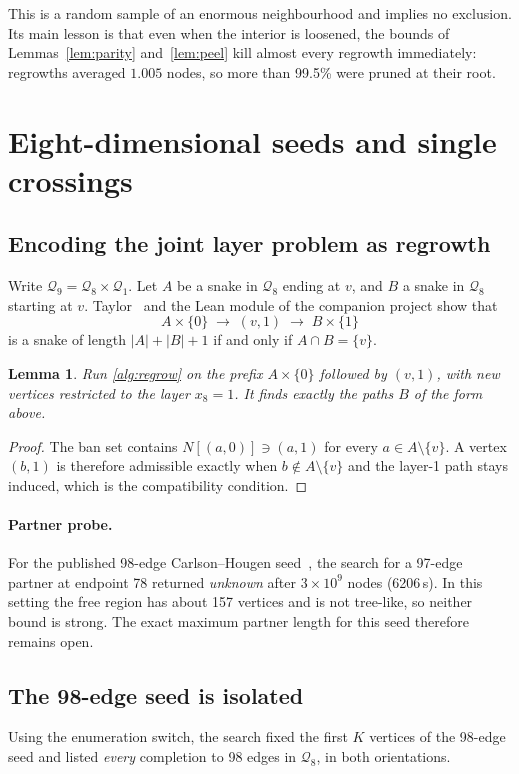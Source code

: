 \documentclass[11pt,a4paper]{article}
\newtheorem{lemma}[theorem]{Lemma}
\theoremstyle{definition}
\newcommand{\Q}{\mathcal{Q}}
\newcommand{\N}{N}
\begin{document}
This is a random sample of an enormous neighbourhood and implies no exclusion. Its main lesson is that even when the interior is loosened, the bounds of Lemmas~\ref{lem:parity} and~\ref{lem:peel} kill almost every regrowth immediately: regrowths averaged $1.005$ nodes, so more than 99.5\% were pruned at their root.

\section{Eight-dimensional seeds and single crossings}\label{sec:q8}

\subsection{Encoding the joint layer problem as regrowth}
Write $\Q_9=\Q_8\times\Q_1$. Let $A$ be a snake in $\Q_8$ ending at $v$, and $B$ a snake in $\Q_8$ starting at $v$. Taylor~\cite{taylor} and the Lean module of the companion project show that
\[
A\times\{0\}\;\to\;(v,1)\;\to\;B\times\{1\}
\]
is a snake of length $|A|+|B|+1$ if and only if $A\cap B=\{v\}$.

\begin{lemma}\label{lem:layer}
Run \cref{alg:regrow} on the prefix $A\times\{0\}$ followed by $(v,1)$, with new vertices restricted to the layer $x_8=1$. It finds exactly the paths $B$ of the form above.
\end{lemma}

\begin{proof}
The ban set contains $\N[(a,0)]\ni(a,1)$ for every $a\in A\setminus\{v\}$. A vertex $(b,1)$ is therefore admissible exactly when $b\notin A\setminus\{v\}$ and the layer-1 path stays induced, which is the compatibility condition.
\end{proof}

\paragraph{Partner probe.} For the published 98-edge Carlson--Hougen seed~\cite{records}, the search for a 97-edge partner at endpoint 78 returned \emph{unknown} after $3\times10^9$ nodes (6206\,s). In this setting the free region has about 157 vertices and is not tree-like, so neither bound is strong. The exact maximum partner length for this seed therefore remains open.

\subsection{The 98-edge seed is isolated}
Using the enumeration switch, the search fixed the first $K$ vertices of the 98-edge seed and listed \emph{every} completion to 98 edges in $\Q_8$, in both orientations.
\end{document}
